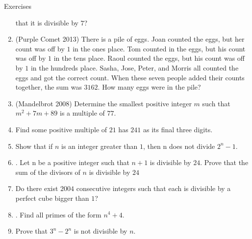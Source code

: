 \begin{xcb}{Exercises}
\begin{enumerate}
that it is divisible by $7$?
\item (Purple Comet 2013) There is a pile of eggs. Joan counted the eggs, but her count was off by $1$ in the ones place. Tom counted in the eggs, but his count was off by $1$ in the tens place. Raoul counted the eggs, but his count was off by $1$ in the hundreds place. Sasha, Jose, Peter, and Morris all counted the eggs and got the correct count. When these seven people added their counts together, the sum was $3162$. How many eggs were in the pile?
\item (Mandelbrot 2008) Determine the smallest positive integer $m$ such that $m^2 + 7m + 89$ is a multiple of $77$.
\item  Find some positive multiple of $21$ has $241$ as its final three digits.
\item Show that if $n$ is an integer greater than $1$, then n does not divide $2^n - 1$.
\item . Let n be a positive integer such that $n + 1$ is divisible by $24$. Prove that the sum of the divisors of $n$ is divisible by $24$
\item Do there exist $2004$ consecutive integers such that each is divisible by a perfect cube bigger than $1$?
\item . Find all primes of the form $n^4 + 4$.
\item Prove that $3^n-2^n$ is not divisible by $n$.

\end{enumerate}
\end{xcb}
